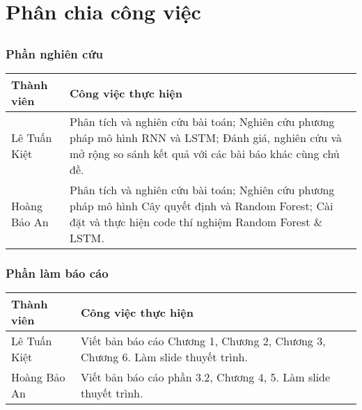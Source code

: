 \chapter*{Phân chia công việc}

\section*{}

\subsection*{Phần nghiên cứu}

\begin{tabular}{|>{\raggedright\arraybackslash}p{4cm}|>{\raggedright\arraybackslash}p{10cm}|}
\hline
\textbf{Thành viên} & \textbf{Công việc thực hiện} \\
\hline
Lê Tuấn Kiệt & Phân tích và nghiên cứu bài toán; Nghiên cứu phương pháp mô hình RNN và LSTM; Đánh giá, nghiên cứu và mở rộng so sánh kết quả với các bài báo khác cùng chủ đề. \\
\hline
Hoàng Bảo An & Phân tích và nghiên cứu bài toán; Nghiên cứu phương pháp mô hình Cây quyết định và Random Forest; Cài đặt và thực hiện code thí nghiệm Random Forest \& LSTM. \\
\hline
\end{tabular}

\vspace{1cm}

\subsection*{Phần làm báo cáo}

\begin{tabular}{|>{\raggedright\arraybackslash}p{4cm}|>{\raggedright\arraybackslash}p{10cm}|}
\hline
\textbf{Thành viên} & \textbf{Công việc thực hiện} \\
\hline
Lê Tuấn Kiệt & Viết bản báo cáo Chương 1, Chương 2, Chương 3, Chương 6. Làm slide thuyết trình. \\
\hline
Hoàng Bảo An & Viết bản báo cáo phần 3.2, Chương 4, 5. Làm slide thuyết trình. \\
\hline
\end{tabular}